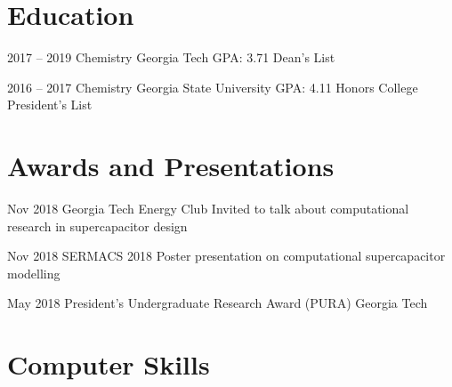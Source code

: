 \documentclass{tccv}
\begin{document}
\vspace{150pt}

\section{Education}

\begin{yearlist}

\item{2017 -- 2019}
     {Chemistry}
     {Georgia Tech \newline
     GPA: 3.71 \newline
     Dean's List}

\item{2016 -- 2017}
     {Chemistry}
     {Georgia State University \newline
     GPA: 4.11 \newline
     Honors College \newline
     President's List}
     
\end{yearlist}

\vspace{-12pt}

\section{Awards and Presentations}

\begin{yearlist}

\item{Nov 2018}
     {Georgia Tech Energy Club}
     {Invited to talk about computational research in supercapacitor design}

\item{Nov 2018}
     {SERMACS 2018}
     {Poster presentation on computational supercapacitor modelling}

\item{May 2018}
     {President's Undergraduate Research Award (PURA)}
     {Georgia Tech}

\end{yearlist}

\vspace{-18pt}

\section{Computer Skills}
\end{document}
